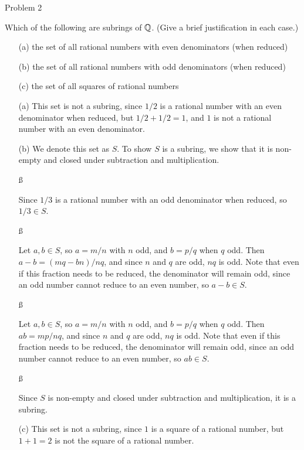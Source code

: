 \documentclass{hmwk}
\begin{document}
\begin{problem}{Problem 2}

\pre Which of the following are subrings of $\mathbb{Q}$. (Give a brief justification in each case.)

\begin{itemize}
    \item[(a)] the set of all rational numbers with even denominators (when reduced)
    \item[(b)] the set of all rational numbers with odd denominators (when reduced)
    \item[(c)] the set of all squares of rational numbers
\end{itemize}
    
\end{problem}

\begin{solution}
\begin{itemize}
    \item[(a)] This set is not a subring, since $1/2$ is a rational number with an even denominator when reduced, but $1/2 + 1/2 = 1$, and $1$ is not a rational number with an even denominator. 

    \item[(b)] We denote this set as $S$. To show $S$ is a subring, we show that it is non-empty and closed under subtraction and multiplication. 

    \ss 

    Since $1/3$ is a rational number with an odd denominator when reduced, so $1/3 \in S$.

    \ss

    Let $a, b \in S$, so $a = m/n$ with $n$ odd, and $b = p/q$ when $q$ odd. Then $a - b = (mq - bn)/nq$, and since $n$ and $q$ are odd, $nq$ is odd. Note that even if this fraction needs to be reduced, the denominator will remain odd, since an odd number cannot reduce to an even number, so $a - b \in S$. 

    \ss 

    Let $a, b \in S$, so $a = m/n$ with $n$ odd, and $b = p/q$ when $q$ odd. Then $ab = mp/nq$, and since $n$ and $q$ are odd, $nq$ is odd. Note that even if this fraction needs to be reduced, the denominator will remain odd, since an odd number cannot reduce to an even number, so $ab \in S$.

    \ss

    Since $S$ is non-empty and closed under subtraction and multiplication, it is a subring.

    \item[(c)] This set is not a subring, since $1$ is a square of a rational number, but $1 + 1 = 2$ is not the square of a rational number. 
\end{itemize}
\end{solution}
\end{document}
